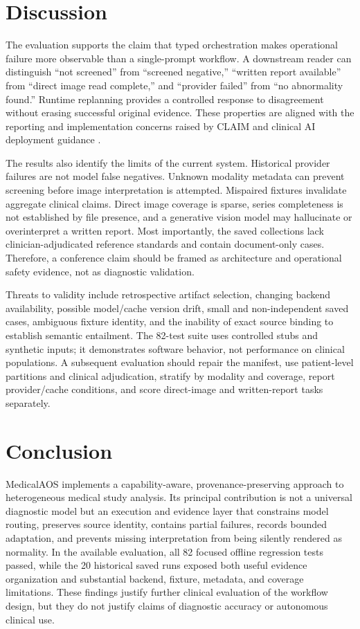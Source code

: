 \documentclass[a4paper,conference]{IEEEtran}
\begin{document}
\section{Discussion}
The evaluation supports the claim that typed orchestration makes operational failure more observable than a single-prompt workflow. A downstream reader can distinguish “not screened” from “screened negative,” “written report available” from “direct image read complete,” and “provider failed” from “no abnormality found.” Runtime replanning provides a controlled response to disagreement without erasing successful original evidence. These properties are aligned with the reporting and implementation concerns raised by CLAIM and clinical AI deployment guidance \cite{mongan2020claim,recht2020integrating}.

The results also identify the limits of the current system. Historical provider failures are not model false negatives. Unknown modality metadata can prevent screening before image interpretation is attempted. Mispaired fixtures invalidate aggregate clinical claims. Direct image coverage is sparse, series completeness is not established by file presence, and a generative vision model may hallucinate or overinterpret a written report. Most importantly, the saved collections lack clinician-adjudicated reference standards and contain document-only cases. Therefore, a conference claim should be framed as architecture and operational safety evidence, not as diagnostic validation.

Threats to validity include retrospective artifact selection, changing backend availability, possible model/cache version drift, small and non-independent saved cases, ambiguous fixture identity, and the inability of exact source binding to establish semantic entailment. The 82-test suite uses controlled stubs and synthetic inputs; it demonstrates software behavior, not performance on clinical populations. A subsequent evaluation should repair the manifest, use patient-level partitions and clinical adjudication, stratify by modality and coverage, report provider/cache conditions, and score direct-image and written-report tasks separately.

\section{Conclusion}
MedicalAOS implements a capability-aware, provenance-preserving approach to heterogeneous medical study analysis. Its principal contribution is not a universal diagnostic model but an execution and evidence layer that constrains model routing, preserves source identity, contains partial failures, records bounded adaptation, and prevents missing interpretation from being silently rendered as normality. In the available evaluation, all 82 focused offline regression tests passed, while the 20 historical saved runs exposed both useful evidence organization and substantial backend, fixture, metadata, and coverage limitations. These findings justify further clinical evaluation of the workflow design, but they do not justify claims of diagnostic accuracy or autonomous clinical use.
\end{document}
